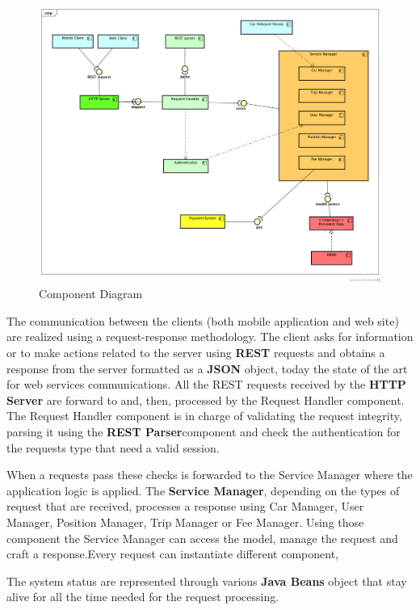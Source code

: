 
\begin{figure}[H]	
	\centering
	\includegraphics[width=\textwidth]{img/backend_component_diagram}
	\caption{Component Diagram}
\end{figure}

The communication between the clients (both mobile application and web site) are realized using a request-response methodology. The client asks for information or to make actions related to the server using \textbf{REST} requests and obtains a response from the server formatted as a \textbf{JSON} object, today the state of the art for web services communications.
All the REST requests received by the \textbf{HTTP Server} are forward to and, then, processed by the Request Handler component. The Request Handler component is in charge of validating the request integrity, parsing it using the \textbf{REST Parser}component and check the authentication for the requests type that need a valid session.

When a requests pass these checks is forwarded to the Service Manager where the application logic is applied.
The \textbf{Service Manager}, depending on the types of request that are received,  processes a response using Car Manager, User Manager, Position Manager, Trip Manager or Fee Manager.
Using those component the Service Manager can access the model, manage the request and craft a response.Every request can instantiate different component,

The system status are represented through various \textbf{Java Beans} object that stay alive for all the time needed for the request processing.

